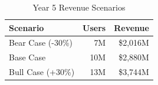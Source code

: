 \begin{table}[H]
\centering
\caption{Year 5 Revenue Scenarios}
\begin{tabular}{|l|r|r|}
\hline
\rowcolor{lightgray}
\textbf{Scenario} & \textbf{Users} & \textbf{Revenue} \\
\hline
Bear Case (-30\%) & 7M & \$2,016M \\
\hline
Base Case & 10M & \$2,880M \\
\hline
Bull Case (+30\%) & 13M & \$3,744M \\
\hline
\end{tabular}
\end{table}

